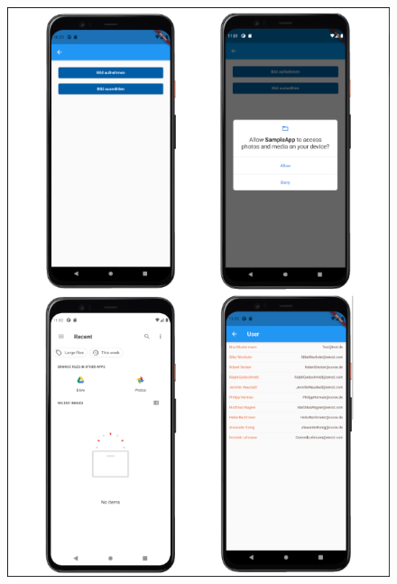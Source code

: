 \newpage
\begin{figure}[ht!]
 \includegraphics[width=\textwidth,keepaspectratio]{Images/Screenshot/AndroidScrenshotIflutter2.png}
\end{figure}
